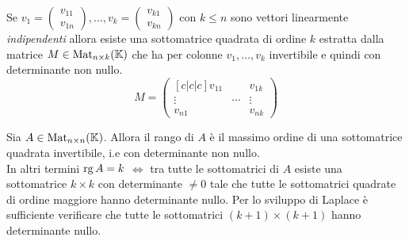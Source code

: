 \begin{prop}
	Se $ v_1 = \begin{pmatrix} v_{11} \\ v_{1n} \end{pmatrix}, \ldots, v_k = \begin{pmatrix} v_{k1} \\ v_{kn} \end{pmatrix} $ con $ k \leq n $ sono vettori linearmente \emph{indipendenti} allora esiste una sottomatrice quadrata di ordine $ k $ estratta dalla matrice $ M \in \mathrm{Mat}_{n \times k} (\mathbb{K}) $ che ha per colonne $ v_1, \ldots, v_k $ invertibile e quindi con determinante non nullo. 
	\[M = \begin{pmatrix}[c|c|c]
	v_{11} & & v_{1k} \\
	\vdots & \cdots & \vdots \\
	v_{n1} & & v_{nk}
	\end{pmatrix}\]
\end{prop}

\begin{thm}
	Sia $ A \in \mathrm{Mat}_{n \times n} (\mathbb{K}) $. Allora il rango di $ A $ è il massimo ordine di una sottomatrice quadrata invertibile, i.e con determinante non nullo. \\
	In altri termini $ \operatorname{rg} A = k $ $ \iff $ tra tutte le sottomatrici di $ A $ esiste una sottomatrice $ k \times k $ con determinante $ \neq 0 $ tale che tutte le sottomatrici quadrate di ordine maggiore hanno determinante nullo. Per lo sviluppo di Laplace è sufficiente verificare che tutte le sottomatrici $ (k + 1) \times (k + 1) $ hanno determinante nullo. 
\end{thm}

